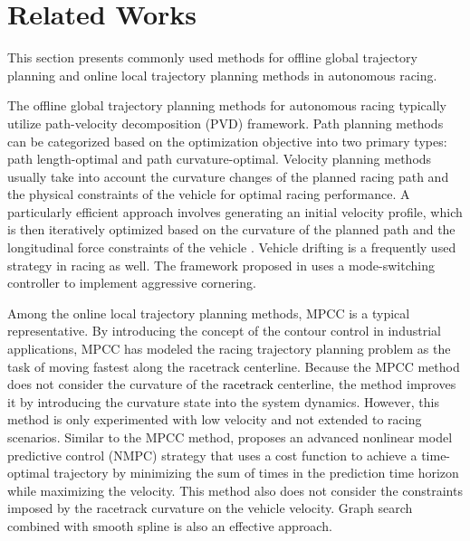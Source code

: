 \section{Related Works}
\label{Related_Works}

This section presents commonly used methods for offline global trajectory planning and online local trajectory planning methods in autonomous racing.

The offline global trajectory planning methods for autonomous racing typically utilize path-velocity decomposition (PVD)  framework\cite{heilmeier2019minimum}. Path planning methods can be categorized based on the optimization objective into two primary types: path length-optimal\cite{braghinRaceDriverModel2008} and path curvature-optimal\cite{heilmeier2019minimum}. Velocity planning methods usually take into account the curvature changes of the planned racing path and the physical constraints of the vehicle for optimal racing performance\cite{heilmeier2020minimum}. A particularly efficient approach involves generating an initial velocity profile, which is then iteratively optimized based on the curvature of the planned path and the longitudinal force constraints of the vehicle \cite{kapaniaSequentialTwoStepAlgorithm2016}. Vehicle drifting is a frequently used strategy in racing as well. The framework proposed in\cite{weng2024aggressive} uses a mode-switching  controller to implement aggressive cornering.
	
Among the online local trajectory planning methods, MPCC is a typical representative. By introducing the concept of the contour control in industrial applications, MPCC has modeled the racing trajectory planning problem as the task of moving fastest along the racetrack centerline. Because the MPCC method does not consider the curvature of the \textcolor{black}{racetrack} centerline, the method\cite{lyonsCurvatureAwareModelPredictive2023}  improves it by introducing the curvature state into the system dynamics. However, this method is only experimented with low velocity and not extended to racing scenarios. Similar to the MPCC method, \cite{sivashangaranNonlinearModelPredictive2022} proposes an advanced nonlinear model predictive control (NMPC) strategy that uses a cost function to achieve a time-optimal trajectory by minimizing the sum of times in the prediction time horizon while maximizing the velocity. This method also does not consider the constraints imposed by the racetrack curvature on the vehicle velocity. Graph search combined with smooth spline is also an effective approach\cite{stahl2019multilayer}.

